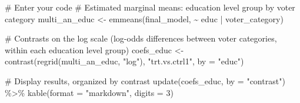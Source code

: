\documentclass[
  letterpaper,
  DIV=11,
  numbers=noendperiod]{scrartcl}
\newenvironment{Shaded}{\begin{snugshade}}{\end{snugshade}}
\newcommand{\AttributeTok}[1]{\textcolor[rgb]{0.40,0.45,0.13}{#1}}
\newcommand{\CommentTok}[1]{\textcolor[rgb]{0.37,0.37,0.37}{#1}}
\newcommand{\DecValTok}[1]{\textcolor[rgb]{0.68,0.00,0.00}{#1}}
\newcommand{\FunctionTok}[1]{\textcolor[rgb]{0.28,0.35,0.67}{#1}}
\newcommand{\NormalTok}[1]{\textcolor[rgb]{0.00,0.23,0.31}{#1}}
\newcommand{\OtherTok}[1]{\textcolor[rgb]{0.00,0.23,0.31}{#1}}
\newcommand{\SpecialCharTok}[1]{\textcolor[rgb]{0.37,0.37,0.37}{#1}}
\newcommand{\StringTok}[1]{\textcolor[rgb]{0.13,0.47,0.30}{#1}}
\begin{document}
\begin{Shaded}
\begin{Highlighting}[]
\CommentTok{\# Enter your code}
\CommentTok{\# Estimated marginal means: education level group by voter category}
\NormalTok{multi\_an\_educ }\OtherTok{\textless{}{-}} \FunctionTok{emmeans}\NormalTok{(final\_model, }\SpecialCharTok{\textasciitilde{}}\NormalTok{ educ }\SpecialCharTok{|}\NormalTok{ voter\_category)}

\CommentTok{\# Contrasts on the log scale (log{-}odds differences between voter categories, within each education level group)}
\NormalTok{coefs\_educ }\OtherTok{\textless{}{-}} \FunctionTok{contrast}\NormalTok{(}\FunctionTok{regrid}\NormalTok{(multi\_an\_educ, }\StringTok{"log"}\NormalTok{), }\StringTok{"trt.vs.ctrl1"}\NormalTok{, }\AttributeTok{by =} \StringTok{"educ"}\NormalTok{)}

\CommentTok{\# Display results, organized by contrast}
\FunctionTok{update}\NormalTok{(coefs\_educ, }\AttributeTok{by =} \StringTok{"contrast"}\NormalTok{) }\SpecialCharTok{\%\textgreater{}\%}
  \FunctionTok{kable}\NormalTok{(}\AttributeTok{format =} \StringTok{"markdown"}\NormalTok{, }\AttributeTok{digits =} \DecValTok{3}\NormalTok{)}
\end{Highlighting}
\end{Shaded}
\end{document}
